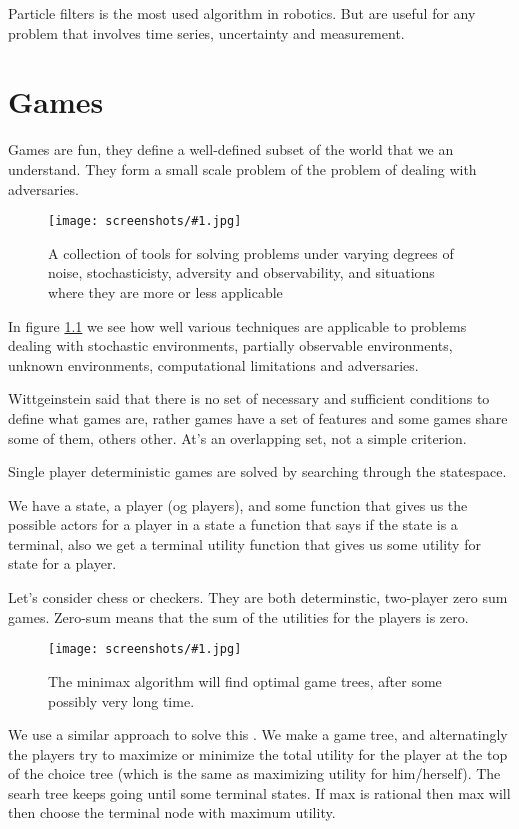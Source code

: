 \documentclass[a4, 12pt, english, USenglish]{scrreprt}
\newcommand{\screenshot}[2]{
\begin{figure}[htb]
\texttt{[image: screenshots/\#1.jpg]}
\label{#1}
\caption{#2}
\end{figure}}
\begin{document}
Particle filters is the most used algorithm in robotics.  But are
useful for any problem that involves time series,  uncertainty and measurement.

\chapter{Games}

Games are fun, they define a well-defined subset of the world that we
an understand.  They form a small scale problem of the problem of
dealing with adversaries.

\screenshot{toolsforproblems}{A collection of tools for solving
  problems under varying degrees of noise, stochasticisty, adversity and
  observability,  and situations
  where they are more or less applicable}

In figure \ref{toolsforproblems} we see how well various techniques
are applicable to problems dealing with stochastic environments,
partially observable environments, unknown environments, computational
limitations and adversaries.

Wittgeinstein said that there is no set of necessary and sufficient
conditions to define what games are, rather games have a set of
features and some games share some of them, others other.  At's an
overlapping set, not a simple criterion.

Single player deterministic games are solved by searching through the
statespace.

We have a state, a player (og players), and some function that gives
us the possible actors for a player in  a state a function that says
if the state is a terminal, also we get a terminal utility function
that gives us some utility for state for a player.

Let's consider chess or checkers.  They are both determinstic,
two-player zero sum games.  Zero-sum means that the sum of the
utilities for the players is zero.

\screenshot{minimax}{The minimax algorithm will find optimal game
  trees, after some possibly very long time.}

We use a similar approach to solve this .  We make a game tree, and
alternatingly the players try to maximize or minimize the total
utility for the player at the top of the choice tree (which is the
same as maximizing utility for him/herself).  The searh tree keeps
going until some terminal states.  If max is rational then max will
then choose the terminal node with maximum utility.  
\end{document}
